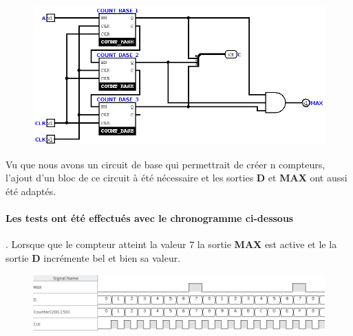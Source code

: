 \documentclass[a4paper]{article} %
\begin{document}
\begin{tcolorbox}[colframe=Monokaimagenta,colback=white]

\begin{figure}[H]
\centering
    \includegraphics[width=1\textwidth]{src/COUNT_8BITS.png}
    \label{fig:count4bits}
\end{figure}

Vu que nous avons un circuit de base qui permettrait de créer n compteurs, l'ajout d'un bloc de ce circuit à été nécessaire et les sorties \textbf{D} et \textbf{MAX} ont aussi été adaptés.

\paragraph{Les tests ont été effectués avec le chronogramme ci-dessous}. Lorsque que le compteur atteint la valeur $7$ la sortie \textbf{MAX} est active et le la sortie \textbf{D} incrémente bel et bien sa valeur.
\begin{figure}[H]
\centering
    \includegraphics[width=1\textwidth]{src/chrono_COUNT_8.png}
    \label{fig:count8bits}
\end{figure}

\end{tcolorbox}
\end{document}

